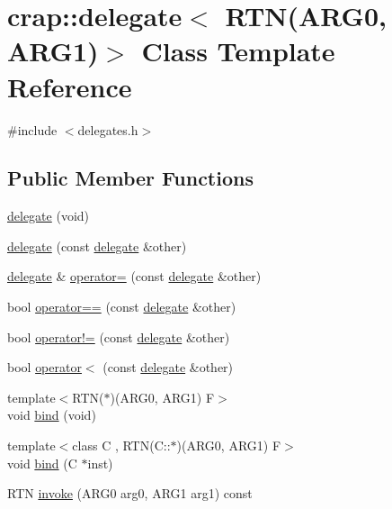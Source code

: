 \hypertarget{classcrap_1_1delegate_3_01_r_t_n_07_a_r_g0_00_01_a_r_g1_08_4}{\section{crap\+:\+:delegate$<$ R\+T\+N(A\+R\+G0, A\+R\+G1)$>$ Class Template Reference}
\label{classcrap_1_1delegate_3_01_r_t_n_07_a_r_g0_00_01_a_r_g1_08_4}
}


{\ttfamily \#include $<$delegates.\+h$>$}

\subsection*{Public Member Functions}
\begin{DoxyCompactItemize}
\item 
\hyperlink{classcrap_1_1delegate_3_01_r_t_n_07_a_r_g0_00_01_a_r_g1_08_4_a74ae17eddf35bbbbe08b8f38b1266cff}{delegate} (void)
\item 
\hyperlink{classcrap_1_1delegate_3_01_r_t_n_07_a_r_g0_00_01_a_r_g1_08_4_a4b290d44f2a2af6400e0e2db9c30a847}{delegate} (const \hyperlink{classcrap_1_1delegate}{delegate} \&other)
\item 
\hyperlink{classcrap_1_1delegate}{delegate} \& \hyperlink{classcrap_1_1delegate_3_01_r_t_n_07_a_r_g0_00_01_a_r_g1_08_4_a968ddc9550af603014982896c7a955f4}{operator=} (const \hyperlink{classcrap_1_1delegate}{delegate} \&other)
\item 
bool \hyperlink{classcrap_1_1delegate_3_01_r_t_n_07_a_r_g0_00_01_a_r_g1_08_4_af3675d24707846024fc57854650dbbc1}{operator==} (const \hyperlink{classcrap_1_1delegate}{delegate} \&other)
\item 
bool \hyperlink{classcrap_1_1delegate_3_01_r_t_n_07_a_r_g0_00_01_a_r_g1_08_4_ab4fac9af192031aa28fbcb81a116d00c}{operator!=} (const \hyperlink{classcrap_1_1delegate}{delegate} \&other)
\item 
bool \hyperlink{classcrap_1_1delegate_3_01_r_t_n_07_a_r_g0_00_01_a_r_g1_08_4_a7b6c5dd1537eb97bf3a80a490a9f0916}{operator$<$} (const \hyperlink{classcrap_1_1delegate}{delegate} \&other)
\item 
{\footnotesize template$<$R\+T\+N($\ast$)(\+A\+R\+G0, A\+R\+G1) F$>$ }\\void \hyperlink{classcrap_1_1delegate_3_01_r_t_n_07_a_r_g0_00_01_a_r_g1_08_4_a30027186bf644d23de09e3860d150a06}{bind} (void)
\item 
{\footnotesize template$<$class C , R\+T\+N(\+C\+::$\ast$)(\+A\+R\+G0, A\+R\+G1) F$>$ }\\void \hyperlink{classcrap_1_1delegate_3_01_r_t_n_07_a_r_g0_00_01_a_r_g1_08_4_a49ac84fc81f9795dbdb1aac46d715f8d}{bind} (C $\ast$inst)
\item 
R\+T\+N \hyperlink{classcrap_1_1delegate_3_01_r_t_n_07_a_r_g0_00_01_a_r_g1_08_4_a8ea8a0a5e0f164910a3e7ae57ef0a553}{invoke} (A\+R\+G0 arg0, A\+R\+G1 arg1) const 
\end{DoxyCompactItemize}


